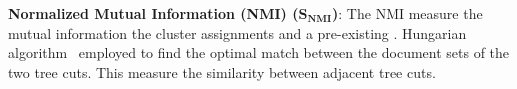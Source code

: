 
\noindent\textbf{\normalsize Normalized Mutual Information (NMI) ($\bm{S_{NMI}}$)}:
The NMI measure  the mutual information  the cluster assignments and a pre-existing .
 Hungarian algorithm~\cite{Steiglitz1982}  employed to find the optimal match between the document sets of the two tree cuts.
This measure  the similarity between adjacent tree cuts.


%




%

